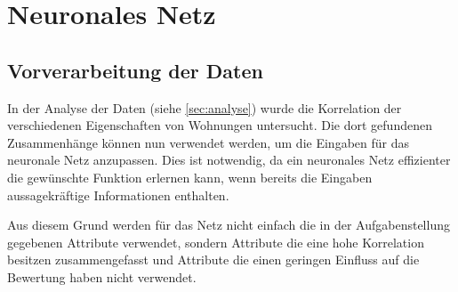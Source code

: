 \section{Neuronales Netz}\label{sec:nn}
\subsection{Vorverarbeitung der Daten}
In der Analyse der Daten (siehe \autoref{sec:analyse}) wurde die Korrelation
der verschiedenen Eigenschaften von Wohnungen untersucht. Die dort gefundenen
Zusammenhänge können nun verwendet werden, um die Eingaben für das neuronale
Netz anzupassen. Dies ist notwendig, da ein neuronales Netz effizienter
die gewünschte Funktion erlernen kann, wenn bereits die Eingaben aussagekräftige
Informationen enthalten.

Aus diesem Grund werden für das Netz nicht einfach die in der Aufgabenstellung
gegebenen Attribute verwendet, sondern Attribute die eine hohe Korrelation besitzen
zusammengefasst und Attribute die einen geringen Einfluss auf die Bewertung haben
nicht verwendet.

